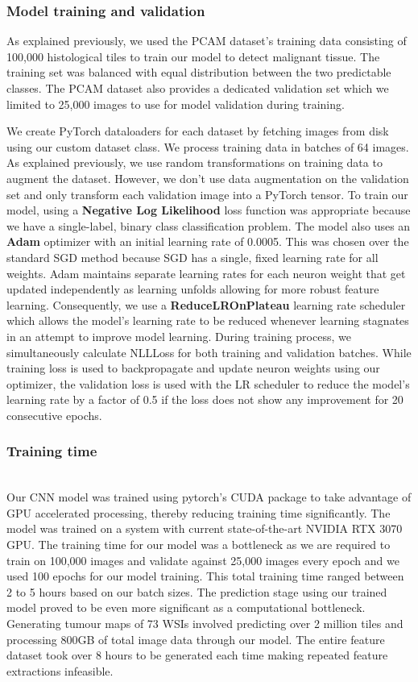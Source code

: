 \documentclass{l4proj}
\begin{document}
\subsubsection{Model training and validation}
As explained previously, we used the PCAM dataset's training data consisting of 100,000 histological tiles to train our model to detect malignant tissue. The training set was balanced with equal distribution between the two predictable classes. The PCAM dataset also provides a dedicated validation set which we limited to 25,000 images to use for model validation during training. 

We create PyTorch dataloaders for each dataset by fetching images from disk using our custom dataset class. We process training data in batches of 64 images. As explained previously, we use random transformations on training data to augment the dataset. However, we don't use data augmentation on the validation set and only transform each validation image into a PyTorch tensor. To train our model, using a \textbf{Negative Log Likelihood} loss function was appropriate because we have a single-label, binary class classification problem. The model also uses an \textbf{Adam} optimizer with an initial learning rate of 0.0005. This was chosen over the standard SGD method because SGD has a single, fixed learning rate for all weights. Adam maintains separate learning rates for each neuron weight that get updated independently as learning unfolds allowing for more robust feature learning. Consequently, we use a \textbf{ReduceLROnPlateau} learning rate scheduler which allows the model's learning rate to be reduced whenever learning stagnates in an attempt to improve model learning. During training process, we simultaneously calculate NLLLoss for both training and validation batches. While training loss is used to backpropagate and update neuron weights using our optimizer, the validation loss is used with the LR scheduler to reduce the model's learning rate by a factor of 0.5 if the loss does not show any improvement for 20 consecutive epochs. 
\\
\subsubsection{Training time}\hfill\\
Our CNN model was trained using pytorch's CUDA package to take advantage of GPU accelerated processing, thereby reducing training time significantly. The model was trained on a system with current state-of-the-art NVIDIA RTX 3070 GPU. The training time for our model was a bottleneck as we are required to train on 100,000 images and validate against 25,000 images every epoch and we used 100 epochs for our model training. This total training time ranged between 2 to 5 hours based on our batch sizes.
The prediction stage using our trained model proved to be even more significant as a computational bottleneck. Generating tumour maps of 73 WSIs involved predicting over 2 million tiles and processing 800GB of total image data through our model. The entire feature dataset took over 8 hours to be generated each time making repeated feature extractions infeasible.
\\
\end{document}
